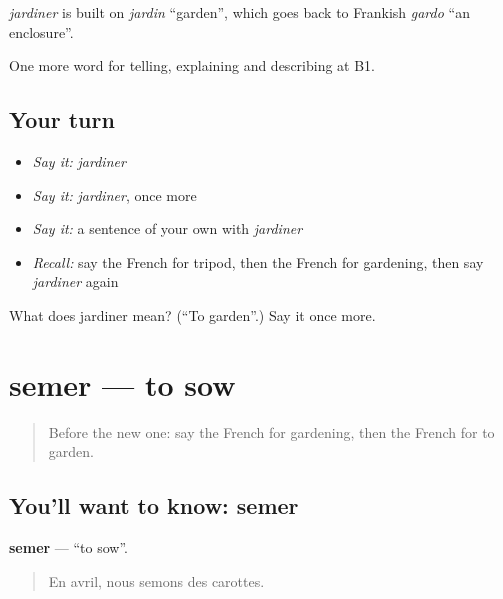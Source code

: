 \begin{cousinweb}
\emph{jardiner} is built on \emph{jardin} \textquotedblleft{}garden\textquotedblright{}, which goes back to Frankish \emph{gardo} \textquotedblleft{}an enclosure\textquotedblright{}.
\end{cousinweb}

\begin{grammarlens}[title={What you've built}]
One more word for telling, explaining and describing at B1.
\end{grammarlens}

\subsection*{Your turn}
\begin{itemize}
\raggedright
  \item \emph{Say it:} \emph{jardiner}
  \item \emph{Say it:} \emph{jardiner}, once more
  \item \emph{Say it:} a sentence of your own with \emph{jardiner}
  \item \emph{Recall:} say the French for tripod, then the French for gardening, then say \emph{jardiner} again
\end{itemize}

\begin{tcolorbox}[breakable,colback=teal!4,colframe=teal!35!black,title={Before you move on}]
What does jardiner mean? (\textquotedblleft{}To garden\textquotedblright{}.) Say it once more.
\end{tcolorbox}
\section[semer]{semer — to sow}

\label{lesson:FR-C503-semer}



\begin{quote}
Before the new one: say the French for gardening, then the French for to garden.
\end{quote}

\subsection*{You'll want to know: semer}
\textbf{semer} — \textquotedblleft{}to sow\textquotedblright{}.

\begin{quote}
En avril, nous semons des carottes.
\end{quote}

